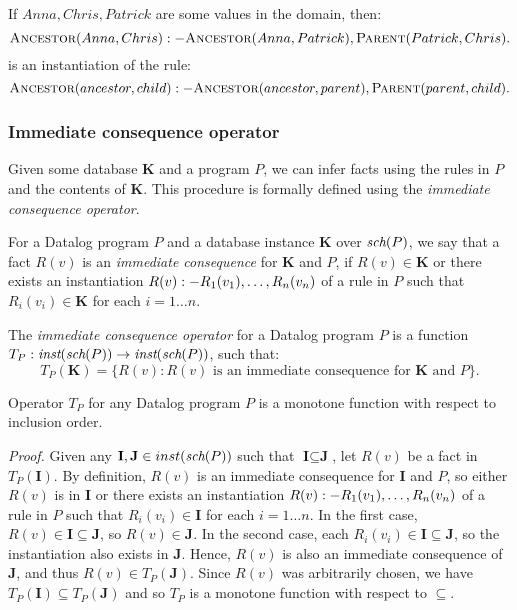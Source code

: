 \begin{exmp}
If $Anna, Chris, Patrick$ are some values in the domain, then:
$$\textsc{Ancestor}(Anna, Chris) :- \textsc{Ancestor} (Anna, Patrick), \textsc{Parent} (Patrick, Chris).$$
is an instantiation of the rule: 
$$\textsc{Ancestor} (ancestor, child) :- \textsc{Ancestor} (ancestor, parent), \textsc{Parent} (parent, child).$$
\end{exmp}

\subsubsection{Immediate consequence operator}
Given some database $\textbf{K}$ and a program $P$, we can infer facts using the rules in $P$ and the contents of $\textbf{K}$. This procedure is formally defined using the \emph{immediate consequence operator}.

\begin{defn}

For a Datalog program $P$ and a database instance $\textbf{K}$ over $\textit{sch}(P)$, we say that a fact $R(v)$ is an \emph{immediate consequence} for $\textbf{K}$ and $P$, if $R(v) \in \textbf{K}$ or there exists an instantiation $R(v) :- R_1(v_1), \dots, R_n(v_n)$ of a rule in $P$ such that $R_i(v_i) \in \textbf{K}$ for each $i = 1\dots n$.

The \emph{immediate consequence operator} for a Datalog program $P$ is a function $T_P: \textit{inst}(\textit{sch}(P)) \to \textit{inst}(\textit{sch}(P))$, such that:
$$T_P(\textbf{K}) = \{ R(v): R(v) \text{ is an immediate consequence for } \textbf{K} \text{ and } P \}.$$

\end{defn}

\begin{lem}
Operator $T_P$ for any Datalog program $P$ is a monotone function with respect to inclusion order.
\end{lem}
\emph{Proof.} Given any $\textbf{I}, \textbf{J} \in inst(\textit{sch}(P))$ such that $\textbf{I} \subseteq \textbf{J}$, let $R(v)$ be a fact in $T_P(\textbf{I})$.
By definition, $R(v)$ is an immediate consequence for $\textbf{I}$ and $P$, so either $R(v)$ is in $\textbf{I}$ or there exists an instantiation
 $R(v) :- R_1(v_1), \dots, R_n(v_n)$ of a rule in $P$ such that $R_i(v_i) \in \textbf{I}$ for each $i = 1\dots n$. 
In the first case, $R(v) \in \textbf{I} \subseteq \textbf{J}$, so $R(v) \in \textbf{J}$. 
In the second case, each $R_i(v_i) \in \textbf{I} \subseteq \textbf{J}$, so the instantiation also exists in $\textbf{J}$. 
Hence, $R(v)$ is also an immediate consequence of $\textbf{J}$, and thus $R(v) \in T_P(\textbf{J})$. 
Since $R(v)$ was arbitrarily chosen, we have  $T_P(\textbf{I}) \subseteq T_P(\textbf{J})$ and so $T_P$ is a monotone function with respect to $\subseteq$.

